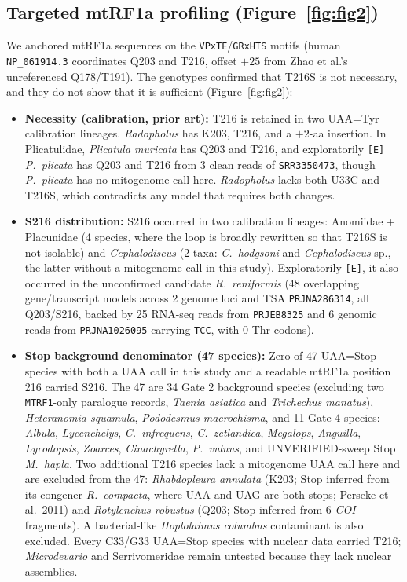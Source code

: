 \documentclass[11pt, a4paper]{article}
\begin{document}
\subsection{Targeted mtRF1a profiling (Figure~\ref{fig:fig2})}
We anchored mtRF1a sequences on the \texttt{VPxTE}/\texttt{GRxHTS} motifs (human \texttt{NP\_061914.3} coordinates Q203 and T216, offset $+25$ from Zhao et al.'s unreferenced Q178/T191). The genotypes confirmed that T216S is not necessary, and they do not show that it is sufficient (Figure~\ref{fig:fig2}):
\begin{itemize}[leftmargin=1.4em, itemsep=0.25em]
\item \textbf{Necessity (calibration, prior art):} T216 is retained in two UAA=Tyr calibration lineages. \textit{Radopholus} has K203, T216, and a $+2$-aa insertion. In Plicatulidae, \textit{Plicatula muricata} has Q203 and T216, and exploratorily \texttt{[E]} \textit{P.\ plicata} has Q203 and T216 from 3 clean reads of \texttt{SRR3350473}, though \textit{P.\ plicata} has no mitogenome call here. \textit{Radopholus} lacks both U33C and T216S, which contradicts any model that requires both changes.
\item \textbf{S216 distribution:} S216 occurred in two calibration lineages: Anomiidae + Placunidae (4 species, where the loop is broadly rewritten so that T216S is not isolable) and \textit{Cephalodiscus} (2 taxa: \textit{C.\ hodgsoni} and \textit{Cephalodiscus} sp., the latter without a mitogenome call in this study). Exploratorily \texttt{[E]}, it also occurred in the unconfirmed candidate \textit{R.\ reniformis} (48 overlapping gene/transcript models across 2 genome loci and TSA \texttt{PRJNA286314}, all Q203/S216, backed by 25 RNA-seq reads from \texttt{PRJEB8325} and 6 genomic reads from \texttt{PRJNA1026095} carrying \texttt{TCC}, with 0 Thr codons).
\item \textbf{Stop background denominator (47 species):} Zero of 47 UAA=Stop species with both a UAA call in this study and a readable mtRF1a position 216 carried S216. The 47 are 34 Gate 2 background species (excluding two \texttt{MTRF1}-only paralogue records, \textit{Taenia asiatica} and \textit{Trichechus manatus}), \textit{Heteranomia squamula}, \textit{Pododesmus macrochisma}, and 11 Gate 4 species: \textit{Albula}, \textit{Lycenchelys}, \textit{C.\ infrequens}, \textit{C.\ zetlandica}, \textit{Megalops}, \textit{Anguilla}, \textit{Lycodopsis}, \textit{Zoarces}, \textit{Cinachyrella}, \textit{P.\ vulnus}, and UNVERIFIED-sweep Stop \textit{M.\ hapla}. Two additional T216 species lack a mitogenome UAA call here and are excluded from the 47: \textit{Rhabdopleura annulata} (K203; Stop inferred from its congener \textit{R.\ compacta}, where UAA and UAG are both stops; Perseke et al.\ 2011) and \textit{Rotylenchus robustus} (Q203; Stop inferred from 6 \textit{COI} fragments). A bacterial-like \textit{Hoplolaimus columbus} contaminant is also excluded. Every C33/G33 UAA=Stop species with nuclear data carried T216; \textit{Microdevario} and Serrivomeridae remain untested because they lack nuclear assemblies.

\end{itemize}
\end{document}
